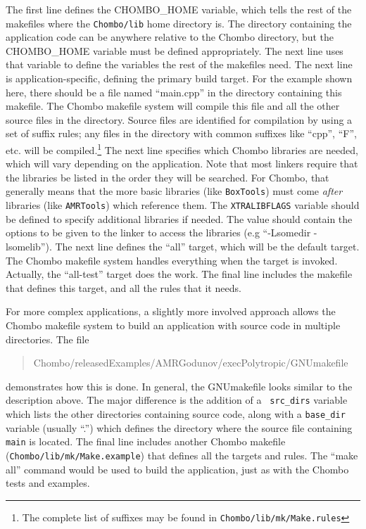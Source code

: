 The first line defines the CHOMBO\_HOME variable, which tells the rest of
the makefiles where the {\tt Chombo/lib} home directory is.  The
directory containing 
the application code can be anywhere relative to the Chombo directory, but
the CHOMBO\_HOME variable must be defined appropriately.  The next line uses
that variable to define the variables the rest of the makefiles need.  The
next line is application-specific, defining the primary build target.
For the example shown here, there should be a file named ``main.cpp''
in the directory containing this makefile.  The Chombo makefile system
will compile this file 
and all the other source files in the directory. Source files are
identified for compilation by using a set of suffix rules; any files
in the directory with common suffixes like ``cpp'', ``F'', etc.
will be compiled.\footnote{The complete list of suffixes may be found
  in {\tt Chombo/lib/mk/Make.rules} } The next line specifies
which Chombo libraries are needed, which will vary depending on the
application. Note that most linkers require that the libraries be
listed in the order they will be searched. For Chombo, that generally
means that the more basic libraries (like {\tt BoxTools}) must come
{\it after} libraries (like {\tt AMRTools}) which reference them. The
{\tt XTRALIBFLAGS} variable should be defined 
to specify additional libraries if needed.  The value should contain the options to be given to the linker
to access the libraries (e.g ``-Lsomedir -lsomelib'').  The next line
defines the ``all'' target, which will be the default target.  The Chombo
makefile system handles everything when the target is invoked.  Actually,
the ``all-test'' target does the work.  The final line includes the makefile
that defines this target, and all the rules that it needs.

For more complex applications, a slightly more involved approach allows the
Chombo makefile system to build an application with source code in multiple
directories.  The file
\begin{quote}
Chombo/releasedExamples/AMRGodunov/execPolytropic/GNUmakefile
\end{quote}
demonstrates how this is done.  In general, the GNUmakefile looks similar to the
description above.  The major difference is the addition of a {\tt
  src\_dirs} variable which lists the other directories 
containing source code, along with a {\tt base\_dir} variable (usually
``.'') which defines the directory where the source file containing
{\tt main} is located.  The final line includes another Chombo makefile
({\tt Chombo/lib/mk/Make.example}) that defines all the targets and rules.  The ``make all'' command would be used to build the application, just as with
the Chombo tests and examples.

